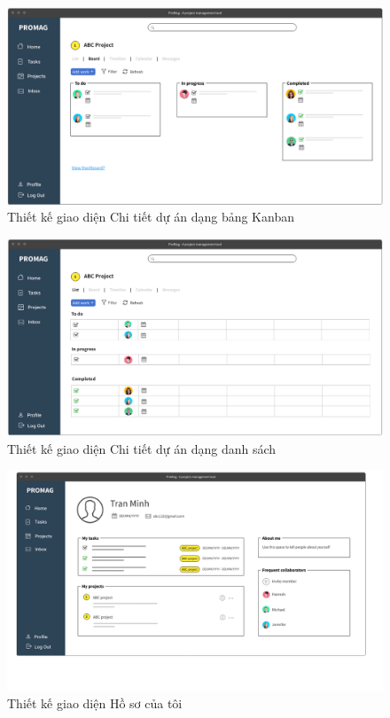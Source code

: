 \documentclass[../DoAn.tex]{subfiles}
\begin{document}
\newpage

\begin{figure}[H]
    \centering
    \includegraphics[width=1.0\linewidth]{Hinhve/Mockup_Kanban.png}
    \caption{Thiết kế giao diện Chi tiết dự án dạng bảng Kanban}
    \label{fig:Mockup_Kanban}
\end{figure}

\begin{figure}[H]
    \centering
    \includegraphics[width=1.0\linewidth]{Hinhve/Mockup_TaskList.png}
    \caption{Thiết kế giao diện Chi tiết dự án dạng danh sách}
    \label{fig:Mockup_TaskList}
\end{figure}

\newpage

\begin{figure}[H]
    \centering
    \includegraphics[width=1.0\linewidth]{Hinhve/Mockup_Profile.png}
    \caption{Thiết kế giao diện Hồ sơ của tôi}
    \label{fig:Mockup_Profile}
\end{figure}
\end{document}
